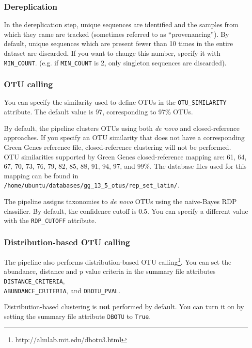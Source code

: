 \documentclass[11pt, oneside]{article}   	%
\begin{document}
\subsubsection{Dereplication}

In the dereplication step, unique sequences are identified and the
samples from which they came are tracked (sometimes referred to as 
``provenancing''). By default, unique sequences which are present fewer
than 10 times in the entire dataset are discarded. If you want to change
this number, specify it with \texttt{MIN\_COUNT}.  (e.g. if \texttt{MIN\_COUNT}
is 2, only singleton sequences are discarded).

\subsubsection{OTU calling}

You can specify the similarity used to define OTUs in the \texttt{OTU\_SIMILARITY}
attribute. The default value is 97, corresponding to 97\% OTUs.

By default, the pipeline clusters OTUs using both \textit{de novo} and closed-reference
approaches. If you specify an OTU similarity that does not have a corresponding
Green Genes reference file, closed-reference clustering will not be performed. 
OTU similarities supported by Green Genes closed-reference mapping are: 61, 64, 67, 70, 73, 76, 79, 82, 85, 88, 91, 94, 97, and 99\%. 
The database files used for this mapping can be found in \texttt{/home/ubuntu/databases/gg\_13\_5\_otus/rep\_set\_latin/}.

The pipeline assigns taxonomies to \textit{de novo} OTUs using the naive-Bayes RDP
classifier. By default, the confidence cutoff is 0.5. You can specify a different
value with the \texttt{RDP\_CUTOFF} attribute.

\subsubsection{Distribution-based OTU calling}

The pipeline also performs distribution-based OTU calling\footnote{http://almlab.mit.edu/dbotu3.html}. 
You can set the abundance, distance and p value criteria
in the summary file attributes \texttt{DISTANCE\_CRITERIA}, \\
\texttt{ABUNDANCE\_CRITERIA}, and \texttt{DBOTU\_PVAL}.

Distribution-based clustering is \textbf{not} performed by default. 
You can turn it on by setting the summary file attribute \texttt{DBOTU} to \texttt{True}.
\end{document}
